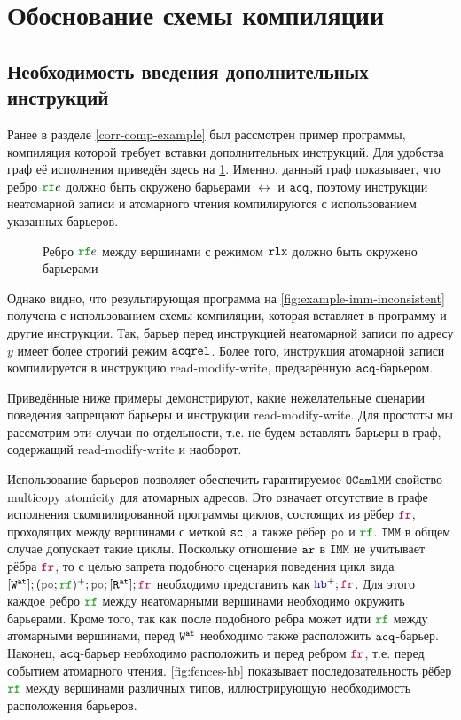 \documentclass[14pt]{matmex-diploma-custom}
\newcommand{\IMM}{\mathtt{IMM}}
\newcommand{\OMM}{\mathtt{OCaml}\allowbreak \mathtt{MM}}
\begin{document}
\section{Обоснование схемы компиляции}
\label{compilation-scheme}

\subsection{Необходимость введения дополнительных инструкций}
\label{extra-instrs}

Ранее в разделе \ref{corr-comp-example} был рассмотрен пример программы, компиляция которой требует вставки дополнительных инструкций. Для удобства граф её исполнения приведён здесь на \cref{fig:example-imm-inconsistent-copy}. Именно, данный граф показывает, что ребро $\lRF e$ должно быть окружено барьерами $\rel$ и ${\mathtt{acq}}$, поэтому инструкции неатомарной записи и атомарного чтения компилируются с использованием указанных барьеров.


\renewcommand{\hsIV}{4}
\begin{figure}[h]
  \centering
  \begin{minipage}{0.9\textwidth}
    \centering
  \end{minipage}
  \caption{Ребро $\lRF e$ между вершинами с режимом $\mathtt{rlx}$ должно быть окружено барьерами}
  \label{fig:example-imm-inconsistent-copy}
\end{figure}


Однако видно, что результирующая программа на \cref{fig:example-imm-inconsistent} получена с использованием схемы компиляции, которая вставляет в программу и другие инструкции. Так, барьер перед инструкцией неатомарной записи по адресу $y$ имеет более строгий режим ${\mathtt{acqrel}}$. Более того, инструкция атомарной записи компилируется в инструкцию read-modify-write, предварённую ${\mathtt{acq}}$-барьером.

Приведённые ниже примеры демонстрируют, какие нежелательные сценарии поведения запрещают барьеры и инструкции read-modify-write. Для простоты мы рассмотрим эти случаи по отдельности, т.е. не будем вставлять барьеры в граф, содержащий read-modify-write и наоборот. 

Использование барьеров позволяет обеспечить гарантируемое $\OMM$ свойство multicopy atomicity для атомарных адресов. Это означает отсутствие в графе исполнения скомпилированной программы циклов, состоящих из рёбер $\lFR$, проходящих между вершинами с меткой ${\mathtt{sc}}$, а также рёбер $\lPO$ и $\lRF$. $\IMM$ в общем случае допускает такие циклы. Поскольку отношение $\lAR$ в $\IMM$ не учитывает рёбра $\lFR$, то с целью запрета подобного сценария поведения цикл вида $[\lW^\at];(\lPO; \lRF)^{+};\lPO;[\lR^\at];\lFR$ необходимо представить как $\lHB^{+};\lFR$. Для этого каждое ребро $\lRF$ между неатомарными вершинами необходимо окружить барьерами. Кроме того, так как после подобного ребра может идти $\lRF$ между атомарными вершинами, перед ${\mathtt{W}}^{\mathtt{at}}$ необходимо также расположить ${\mathtt{acq}}$-барьер. Наконец, ${\mathtt{acq}}$-барьер необходимо расположить и перед ребром $\lFR$, т.е. перед событием атомарного чтения. \cref{fig:fences-hb} показывает последовательность рёбер $\lRF$ между вершинами различных типов, иллюстрирующую необходимость расположения барьеров. 
\end{document}
